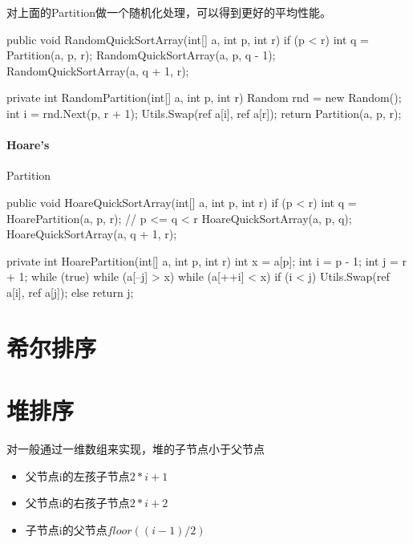 对上面的Partition做一个随机化处理，可以得到更好的平均性能。
\begin{CSharp}
        public void RandomQuickSortArray(int[] a, int p, int r)
        {
            if (p < r)
            {
                int q = Partition(a, p, r);
                RandomQuickSortArray(a, p, q - 1);
                RandomQuickSortArray(a, q + 1, r);
            }
        }

        private int RandomPartition(int[] a, int p, int r)
        {
            Random rnd = new Random();
            int i = rnd.Next(p, r + 1);
            Utils.Swap(ref a[i], ref a[r]);
            return Partition(a, p, r);
        }
\end{CSharp}

\paragraph{Hoare's} Partition
\begin{CSharp}
        public void HoareQuickSortArray(int[] a, int p, int r)
        {
            if (p < r)
            {
                int q = HoarePartition(a, p, r); // p <= q < r
                HoareQuickSortArray(a, p, q);
                HoareQuickSortArray(a, q + 1, r);
            }
        }

        private int HoarePartition(int[] a, int p, int r)
        {
            int x = a[p];
            int i = p - 1;
            int j = r + 1;
            while (true)
            {
                while (a[--j] > x) { }
                while (a[++i] < x) { }
                if (i < j)
                {
                    Utils.Swap(ref a[i], ref a[j]);
                }
                else
                {
                    return j;
                }
            }
        }
\end{CSharp}

\section{希尔排序}


\section{堆排序}
对一般通过一维数组来实现，堆的子节点小于父节点
\begin{itemize}
\item 父节点i的左孩子节点$2*i+1$
\item 父节点i的右孩子节点$2*i+2$
\item 子节点i的父节点$floor((i-1)/2)$
\end{itemize}

